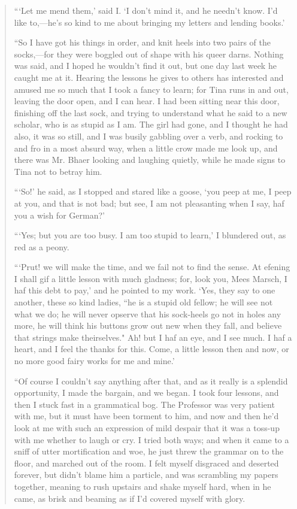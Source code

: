 \begin{quote}
```Let me mend them,' said I.
`I don't mind it, and he
needn't know. I'd like
to,---he's so kind to me about bringing my letters and
lending books.'

``So I have got his things in order, and knit heels into two pairs of the
socks,---for they were boggled out of shape with his queer darns.
Nothing was said, and I hoped he wouldn't find it out,
but one day last week he caught me at it. Hearing the lessons he gives
to others has interested and amused me so much that I took a fancy to
learn; for Tina runs in and out, leaving the door open, and I can hear.
I had been sitting near this door, finishing off the last sock, and
trying to understand what he said to a new scholar, who is as stupid as
I am. The girl had gone, and I thought he had also, it was so still, and
I was busily gabbling over a verb, and rocking to and fro in a most
absurd way, when a little crow made me look up, and there was Mr. Bhaer
looking and laughing quietly, while he made signs to Tina not to betray
him.

```So!' he said, as I stopped and stared
like a goose, `you peep at me, I peep at you, and that
is not bad; but see, I am not pleasanting when I say, haf you a wish for
German?'

```Yes; but you are too busy. I am too stupid to
learn,' I blundered out, as red as a peony.

```Prut! we will make the time, and we fail not to find
the sense. At efening I shall gif a little lesson with much gladness;
for, look you, Mees Marsch, I haf this debt to pay,'
and he pointed to my work. `Yes, they say to one
another, these so kind ladies, ``he is a stupid old fellow; he will see
not what we do; he will never opserve that his sock-heels go not in
holes any more, he will think his buttons grow out new when they fall,
and believe that strings make theirselves." Ah! but I haf an eye, and I
see much. I haf a heart, and I feel the thanks for this. Come, a little
lesson then and now, or no more good fairy works for me and
mine.'

``Of course I couldn't say anything after that, and as it
really is a splendid opportunity, I made the bargain, and we began. I
took four lessons, and then I stuck fast in a grammatical bog. The
Professor was very patient with me, but it must have been torment to
him, and now and then he'd look at me with such an
expression of mild despair that it was a toss-up with me whether to
laugh or cry. I tried both ways; and when it came to a sniff of utter
mortification and woe, he just threw the grammar on to the floor, and
marched out of the room. I felt myself disgraced and deserted forever,
but didn't blame him a particle, and was scrambling my
papers together, meaning to rush upstairs and shake myself hard, when in
he came, as brisk and beaming as if I'd covered myself
with glory.


\end{quote}
